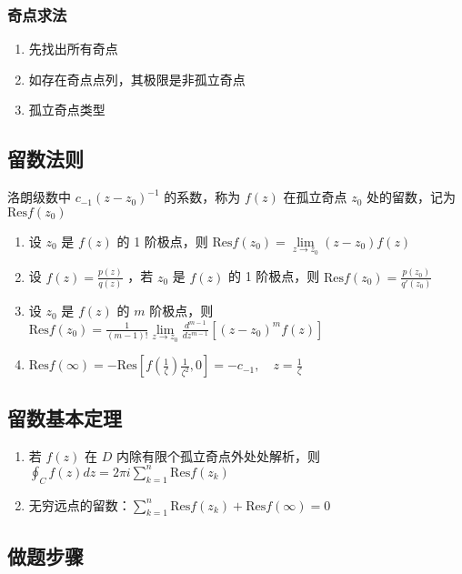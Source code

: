 \documentclass{article}
\begin{document}
\subsubsection{奇点求法}

\begin{enumerate}
    \item 先找出所有奇点
    \item 如存在奇点点列，其极限是非孤立奇点
    \item 孤立奇点类型
\end{enumerate}

\subsection{留数法则}

洛朗级数中 $c_{-1}(z-z_0)^{-1}$ 的系数，称为 $f(z)$ 在孤立奇点 $z_0$ 处的留数，记为 $\text{Res}f(z_0)$

\begin{enumerate}
    \item 设 $z_0$ 是 $f(z)$ 的 1 阶极点，则 $\text{Res}f(z_0) = \lim\limits_{z \to z_0} (z-z_0) f(z)$
    \item 设 $f(z)=\frac{p(z)}{q(z)}$ ，若 $z_0$ 是 $f(z)$ 的 1 阶极点，则 $\text{Res}f(z_0) = \frac{p(z_0)}{q'(z_0)}$
    \item 设 $z_0$ 是 $f(z)$ 的 $m$ 阶极点，则 $\text{Res}f(z_0) = \frac{1}{(m-1)!} \lim\limits_{z \to z_0} \frac{d^{m-1}}{dz^{m-1}} [(z-z_0)^m f(z)]$
    \item $\text{Res}f(\infty) = -\text{Res}[f(\frac{1}{\zeta}) \frac{1}{\zeta^2},0]=-c_{-1}, \quad z=\frac{1}{\zeta}$
\end{enumerate}

\subsection{留数基本定理}

\begin{enumerate}
    \item 若 $f(z)$ 在 $D$ 内除有限个孤立奇点外处处解析，则 $\oint_C f(z) dz = 2\pi i \sum_{k=1}^{n} \text{Res}f(z_k)$
    \item 无穷远点的留数：$\sum_{k=1}^{n} \text{Res}f(z_k) + \text{Res}f(\infty) = 0$
\end{enumerate}

\subsection{做题步骤}
\end{document}

